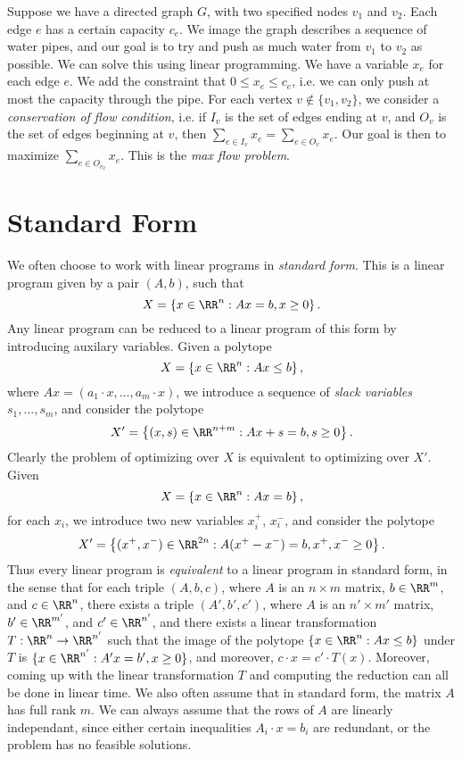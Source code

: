 \begin{example}
    Suppose we have a directed graph $G$, with two specified nodes $v_1$ and $v_2$. Each edge $e$ has a certain capacity $c_e$. We image the graph describes a sequence of water pipes, and our goal is to try and push as much water from $v_1$ to $v_2$ as possible. We can solve this using linear programming. We have a variable $x_e$ for each edge $e$. We add the constraint that $0 \leq x_e \leq c_e$, i.e. we can only push at most the capacity through the pipe. For each vertex $v \not \in \{ v_1, v_2 \}$, we consider a \emph{conservation of flow condition}, i.e. if $I_v$ is the set of edges ending at $v$, and $O_v$ is the set of edges beginning at $v$, then $\sum_{e \in I_v} x_e = \sum_{e \in O_v} x_e$. Our goal is then to maximize $\sum_{e \in O_{v_2}} x_e$. This is the \emph{max flow problem}.
\end{example}

\section{Standard Form}

We often choose to work with linear programs in \emph{standard form}. This is a linear program given by a pair $(A,b)$, such that
%
\[ X = \left\{ x \in \RR^n: Ax = b, x \geq 0 \right\}. \]
%
Any linear program can be reduced to a linear program of this form by introducing auxilary variables. Given a polytope
%
\[ X = \left\{ x \in \RR^n: Ax \leq b \right\}, \]
%
where $Ax = (a_1 \cdot x, \dots, a_m \cdot x)$, we introduce a sequence of \emph{slack variables} $s_1, \dots, s_m$, and consider the polytope
%
\[ X' = \left\{ (x,s) \in \RR^{n+m}: Ax + s = b, s \geq 0 \right\}. \]
%
Clearly the problem of optimizing over $X$ is equivalent to optimizing over $X'$. Given
%
\[ X = \left\{ x \in \RR^n:  Ax = b \right\}, \]
%
for each $x_i$, we introduce two new variables $x_i^+$, $x_i^-$, and consider the polytope
%
\[ X' = \left\{ (x^+,x^-) \in \RR^{2n}: A(x^+ - x^-) = b, x^+, x^- \geq 0 \right\}. \]
%
Thus every linear program is \emph{equivalent} to a linear program in standard form, in the sense that for each triple $(A,b,c)$, where $A$ is an $n \times m$ matrix, $b \in \RR^m$, and $c \in \RR^n$, there exists a triple $(A',b',c')$, where $A$ is an $n' \times m'$ matrix, $b' \in \RR^{m'}$, and $c' \in \RR^{n'}$, and there exists a linear transformation $T: \RR^n \to \RR^{n'}$ such that the image of the polytope $\{ x \in \RR^n: Ax \leq b \}$ under $T$ is $\{ x \in \RR^{n'}: A'x = b', x \geq 0 \}$, and moreover, $c \cdot x = c' \cdot T(x)$. Moreover, coming up with the linear transformation $T$ and computing the reduction can all be done in linear time. We also often assume that in standard form, the matrix $A$ has full rank $m$. We can always assume that the rows of $A$ are linearly independant, since either certain inequalities $A_i \cdot x = b_i$ are redundant, or the problem has no feasible solutions.

